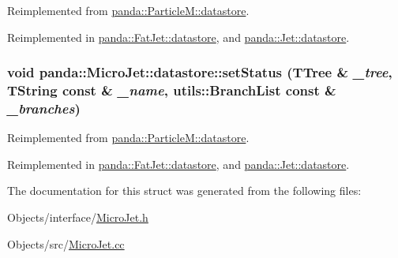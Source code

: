 Reimplemented from \hyperlink{structpanda_1_1ParticleM_1_1datastore_ab9f9e7afb145c12941baa10892ed1811}{panda::ParticleM::datastore}.

Reimplemented in \hyperlink{structpanda_1_1FatJet_1_1datastore_a0064ba6151edcef6eb9d4c5b6a9fdcf7}{panda::FatJet::datastore}, and \hyperlink{structpanda_1_1Jet_1_1datastore_aba38557e272994b9913ffbe323892d7d}{panda::Jet::datastore}.\hypertarget{structpanda_1_1MicroJet_1_1datastore_a5dad86e6e7ed7f7ee5ffb793bb81cbbe}{
\subsubsection[{setStatus}]{\setlength{\rightskip}{0pt plus 5cm}void panda::MicroJet::datastore::setStatus (TTree \& {\em \_\-tree}, \/  TString const \& {\em \_\-name}, \/  {\bf utils::BranchList} const \& {\em \_\-branches})}}
\label{structpanda_1_1MicroJet_1_1datastore_a5dad86e6e7ed7f7ee5ffb793bb81cbbe}


Reimplemented from \hyperlink{structpanda_1_1ParticleM_1_1datastore_a0329bec2c84d16ff16e15824890e7a86}{panda::ParticleM::datastore}.

Reimplemented in \hyperlink{structpanda_1_1FatJet_1_1datastore_a7c0b79a4a6e7875278841d4bc8a7deba}{panda::FatJet::datastore}, and \hyperlink{structpanda_1_1Jet_1_1datastore_ae5a3ebcab7eefec1efc08e4f714ce2ad}{panda::Jet::datastore}.

The documentation for this struct was generated from the following files:\begin{DoxyCompactItemize}
\item 
Objects/interface/\hyperlink{MicroJet_8h}{MicroJet.h}\item 
Objects/src/\hyperlink{MicroJet_8cc}{MicroJet.cc}\end{DoxyCompactItemize}
